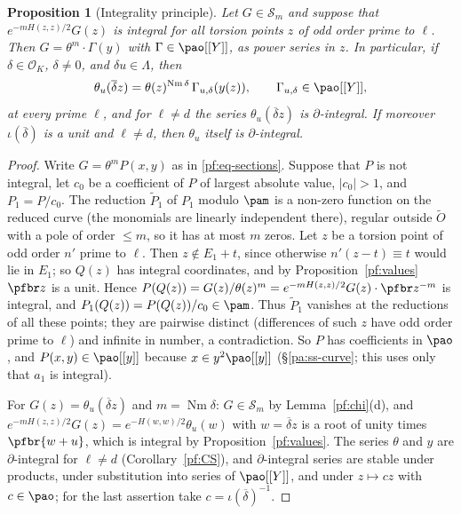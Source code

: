\documentclass[10pt]{amsart}
\newtheorem{proposition}[theorem]{Proposition}
\theoremstyle{definition}
\theoremstyle{remark}
\providecommand{\auNm}{\operatorname{Nm}}
\providecommand{\auO}{\mathcal O}
\providecommand{\aubar}[1]{\overline{#1}}
\begin{document}
\begin{proposition}[Integrality principle]\label{pf:pull}
Let $G\in\mathcal S_m$ and suppose that $e^{-mH(z,z)/2}G(z)$ is integral for all torsion points $z$
of odd order prime to $\ell$. Then $G=\theta^m\cdot\Gamma(y)$ with $\Gamma\in\pao[[Y]]$, as power
series in $z$. In particular, if $\delta\in\auO_K$, $\delta\ne0$, and $\delta u\in\Lambda$, then
\[
\theta_u(\aubar\delta z)=\theta(z)^{\auNm\delta}\,\Gamma_{u,\delta}(y(z)),\qquad\Gamma_{u,\delta}\in
\pao[[Y]],
\]
at every prime $\ell$, and for $\ell\ne d$ the series $\theta_u(\aubar\delta z)$ is
$\partial$-integral. If moreover $\iota(\aubar\delta)$ is a unit and $\ell\ne d$, then $\theta_u$
itself is $\partial$-integral.
\end{proposition}
\begin{proof}
Write $G=\theta^mP(x,y)$ as in \eqref{pf:eq-sections}. Suppose that $P$ is not integral, let
$c_0$ be a coefficient of $P$ of largest absolute value, $|c_0|>1$, and $P_1=P/c_0$. The reduction
$\widetilde P_1$ of $P_1$ modulo $\pam$ is a non-zero function on the reduced curve (the monomials
are linearly independent there), regular outside $\widetilde O$ with a pole of order $\le m$, so
it has at most $m$ zeros. Let $z$ be a torsion point of odd order $n'$
prime to $\ell$. Then $z\notin E_1+t$, since otherwise $n'(z-t)\equiv t$ would lie in $E_1$; so
$Q(z)$ has integral coordinates, and by Proposition~\ref{pf:values} $\pfbr z$ is a unit. Hence
$P(Q(z))=G(z)/\theta(z)^m=e^{-mH(z,z)/2}G(z)\cdot\pfbr z^{-m}$ is integral, and $P_1(Q(z))=P(Q(z))/c_0\in\pam$.
Thus $\widetilde P_1$ vanishes at the reductions of all these points; they are pairwise distinct
(differences of such $z$ have odd order prime to $\ell$) and infinite in number, a contradiction.
So $P$ has coefficients in $\pao$, and $P(x,y)\in\pao[[y]]$ because $x\in y^2\pao[[y]]$
(\S\ref{pa:ss-curve}; this uses only that $a_1$ is integral).

For $G(z)=\theta_u(\aubar\delta z)$ and $m=\auNm\delta$: $G\in\mathcal S_m$ by
Lemma~\ref{pf:chi}(d), and $e^{-mH(z,z)/2}G(z)=e^{-H(w,w)/2}\theta_u(w)$ with $w=\aubar\delta z$ is
a root of unity times $\pfbr{w+u}$, which is integral by Proposition~\ref{pf:values}. The series
$\theta$ and $y$ are $\partial$-integral for $\ell\ne d$ (Corollary~\ref{pf:CS}), and
$\partial$-integral series are stable under products, under substitution into series of
$\pao[[Y]]$, and under $z\mapsto cz$ with $c\in\pao$; for the last assertion take
$c=\iota(\aubar\delta)^{-1}$.
\end{proof}
\end{document}
